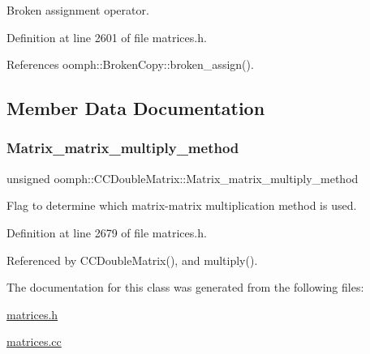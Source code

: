 Broken assignment operator. 



Definition at line 2601 of file matrices.\+h.



References oomph\+::\+Broken\+Copy\+::broken\+\_\+assign().



\subsection{Member Data Documentation}
\mbox{\label{classoomph_1_1CCDoubleMatrix_afb1660974c8f6218c2a000c2d6c6d267}} 
\subsubsection{\texorpdfstring{Matrix\+\_\+matrix\+\_\+multiply\+\_\+method}{Matrix\_matrix\_multiply\_method}}
{\footnotesize\ttfamily unsigned oomph\+::\+C\+C\+Double\+Matrix\+::\+Matrix\+\_\+matrix\+\_\+multiply\+\_\+method\hspace{0.3cm}{\ttfamily [private]}}



Flag to determine which matrix-\/matrix multiplication method is used. 



Definition at line 2679 of file matrices.\+h.



Referenced by C\+C\+Double\+Matrix(), and multiply().



The documentation for this class was generated from the following files\+:\begin{DoxyCompactItemize}
\item 
\hyperlink{matrices_8h}{matrices.\+h}\item 
\hyperlink{matrices_8cc}{matrices.\+cc}\end{DoxyCompactItemize}
